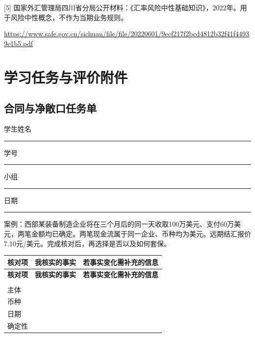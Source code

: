\documentclass[lang=cn,11pt,oneside,openany,chinesefont=nofont,color=blue,titlestyle=hang]{elegantbook}
\begin{document}
{\small{}[5] 国家外汇管理局四川省分局公开材料：《汇率风险中性基础知识》，2022年。用于风险中性概念，不作为当期业务规则。\par{\footnotesize\url{https://www.safe.gov.cn/sichuan/file/file/20220601/9ecf217f2bcd4812b32f41f44939e1b5.pdf}}}

\appendix\chapter{学习任务与评价附件}\label{chap:appendix}

\section{合同与净敞口任务单}\label{sec:g13}

学生姓名\rule{2cm}{.3pt}  学号\rule{2cm}{.3pt}  小组\rule{2cm}{.3pt}  日期\rule{2cm}{.3pt}

案例：西部某装备制造企业将在三个月后的同一天收取100万美元、支付60万美元，两笔金额均已确定。两笔现金流属于同一企业、币种均为美元。远期结汇报价7.10元/美元。完成核对后，再选择是否以及如何套保。

\begingroup\small{}\setlength{\tabcolsep}{6pt}\renewcommand{\arraystretch}{1.24}
\begin{longtable}{>{\raggedright\arraybackslash}p{}>{\raggedright\arraybackslash}p{}>{\raggedright\arraybackslash}p{}}
\toprule[.8pt]\rowcolor{Navy}
\color{white}\bfseries 核对项 & \color{white}\bfseries 我核实的事实 & \color{white}\bfseries 若事实变化需补充的信息 \\
\midrule\endfirsthead
\toprule[.8pt]\rowcolor{Navy}
\color{white}\bfseries 核对项 & \color{white}\bfseries 我核实的事实 & \color{white}\bfseries 若事实变化需补充的信息 \\
\midrule\endhead
\midrule\multicolumn{3}{r}{\footnotesize\color{Muted}续下页}\\\endfoot
\bottomrule[.8pt]\endlastfoot
主体 & \rule{0pt}{9mm} & \rule{0pt}{9mm} \\
\midrule[.25pt]
\rowcolor{Pale}
币种 & \rule{0pt}{9mm} & \rule{0pt}{9mm} \\
\midrule[.25pt]
日期 & \rule{0pt}{9mm} & \rule{0pt}{9mm} \\
\midrule[.25pt]
\rowcolor{Pale}
确定性 & \rule{0pt}{9mm} & \rule{0pt}{9mm} \\
\midrule[.25pt]
\end{longtable}\endgroup
\end{document}
